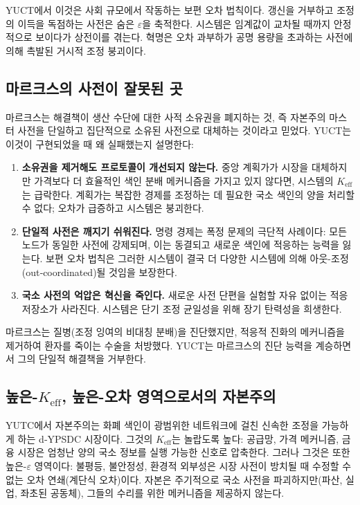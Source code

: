 \documentclass[12pt,a4paper]{article}
\newcommand{\Keff}{K_{\mathrm{eff}}}
\begin{document}
	YUCT에서 이것은 사회 규모에서 작동하는 보편 오차 법칙이다. 갱신을 거부하고 조정의 이득을 독점하는 사전은 숨은 \(\varepsilon\)을 축적한다. 시스템은 임계값이 교차될 때까지 안정적으로 보이다가 상전이를 겪는다. 혁명은 오차 과부하가 공명 용량을 초과하는 사전에 의해 촉발된 거시적 조정 붕괴이다.
	
	\subsection{마르크스의 사전이 잘못된 곳}
	
	마르크스는 해결책이 생산 수단에 대한 사적 소유권을 폐지하는 것, 즉 자본주의 마스터 사전을 단일하고 집단적으로 소유된 사전으로 대체하는 것이라고 믿었다. YUCT는 이것이 구현되었을 때 왜 실패했는지 설명한다:
	
	\begin{enumerate}[leftmargin=*]
		\item \textbf{소유권을 제거해도 프로토콜이 개선되지 않는다.} 중앙 계획가가 시장을 대체하지만 가격보다 더 효율적인 색인 분배 메커니즘을 가지고 있지 않다면, 시스템의 \(\Keff\)는 급락한다. 계획가는 복잡한 경제를 조정하는 데 필요한 국소 색인의 양을 처리할 수 없다; 오차가 급증하고 시스템은 붕괴한다.
		\item \textbf{단일적 사전은 깨지기 쉬워진다.} 명령 경제는 폭정 문제의 극단적 사례이다: 모든 노드가 동일한 사전에 강제되며, 이는 동결되고 새로운 색인에 적응하는 능력을 잃는다. 보편 오차 법칙은 그러한 시스템이 결국 더 다양한 시스템에 의해 아웃-조정(out‑coordinated)될 것임을 보장한다.
		\item \textbf{국소 사전의 억압은 혁신을 죽인다.} 새로운 사전 단편을 실험할 자유 없이는 적응 저장소가 사라진다. 시스템은 단기 조정 균일성을 위해 장기 탄력성을 희생한다.
	\end{enumerate}
	
	마르크스는 질병(조정 잉여의 비대칭 분배)을 진단했지만, 적응적 진화의 메커니즘을 제거하여 환자를 죽이는 수술을 처방했다. YUCT는 마르크스의 진단 능력을 계승하면서 그의 단일적 해결책을 거부한다.
	
	\subsection{높은-\(\Keff\), 높은-오차 영역으로서의 자본주의}
	
	YUTC에서 자본주의는 화폐 색인이 광범위한 네트워크에 걸친 신속한 조정을 가능하게 하는 d‑YPSDC 시장이다. 그것의 \(\Keff\)는 놀랍도록 높다: 공급망, 가격 메커니즘, 금융 시장은 엄청난 양의 국소 정보를 실행 가능한 신호로 압축한다. 그러나 그것은 또한 높은-\(\varepsilon\) 영역이다: 불평등, 불안정성, 환경적 외부성은 시장 사전이 방치될 때 수정할 수 없는 오차 연쇄(계단식 오차)이다. 자본은 주기적으로 국소 사전을 파괴하지만(파산, 실업, 좌초된 공동체), 그들의 수리를 위한 메커니즘을 제공하지 않는다.
	
\end{document}
